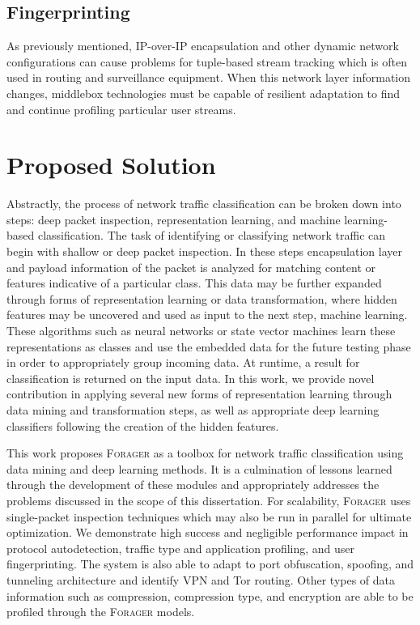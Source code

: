 \subsection{Fingerprinting}

As previously mentioned, IP-over-IP encapsulation and other dynamic network configurations can cause problems for tuple-based stream tracking which is often used in routing and surveillance equipment. When this network layer information changes, middlebox technologies must be capable of resilient adaptation to find and continue profiling particular user streams.

\section{Proposed Solution}

Abstractly, the process of network traffic classification can be broken down into steps: deep packet inspection, representation learning, and machine learning-based classification. The task of identifying or classifying network traffic can begin with shallow or deep packet inspection. In these steps encapsulation layer and payload information of the packet is analyzed for matching content or features indicative of a particular class. This data may be further expanded through forms of representation learning or data transformation, where hidden features may be uncovered and used as input to the next step, machine learning. These algorithms such as neural networks or state vector machines learn these representations as classes and use the embedded data for the future testing phase in order to appropriately group incoming data. At runtime, a result for classification is returned on the input data. In this work, we provide novel contribution in applying several new forms of representation learning through data mining and transformation steps, as  well as appropriate deep learning classifiers following the creation of the hidden features.

This work proposes \textsc{Forager} as a toolbox for network traffic classification using data mining and deep learning methods. It is a culmination of lessons learned through the development of these modules and appropriately addresses the problems discussed in the scope of this dissertation. For scalability, \textsc{Forager} uses single-packet inspection techniques which may also be run in parallel for ultimate optimization. We demonstrate high success and negligible performance impact in protocol autodetection, traffic type and application profiling, and user fingerprinting. The system is also able to adapt to port obfuscation, spoofing, and tunneling architecture and identify VPN and Tor routing. Other types of data information such as compression, compression type, and encryption are able to be profiled through the \textsc{Forager} models.

